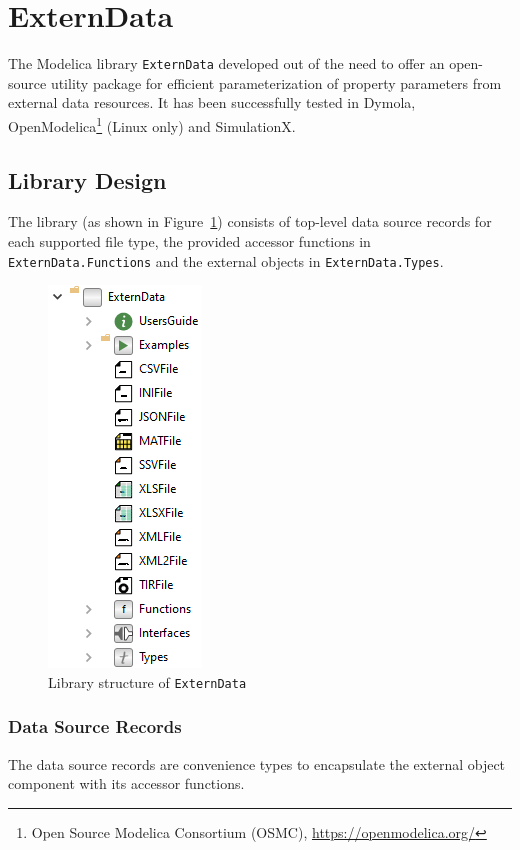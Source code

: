 \documentclass{modelica}
\newcommand{\modelica}[1]{\lstinline[language=modelica]|#1|}
\begin{document}
\section{ExternData}

The Modelica library \modelica{ExternData} developed out of the need to offer an open-source utility package for efficient parameterization of property parameters from external data resources.
It has been successfully tested in Dymola, OpenModelica\footnote{Open Source Modelica Consortium (OSMC),
\url{https://openmodelica.org/}} (Linux only) and SimulationX.

\subsection{Library Design}

The library (as shown in Figure~\ref{fig:ExternData}) consists of top-level data source records for each supported file type, the provided accessor functions in \modelica{ExternData.Functions} and the external objects in \modelica{ExternData.Types}.
\begin{figure}[!hb]
\centering
\includegraphics[scale=0.8]{resources/ExternData.png}
\caption{Library structure of \modelica{ExternData}}
\label{fig:ExternData}
\end{figure}

\subsubsection{Data Source Records}

The data source records are convenience types to encapsulate the external object component with its accessor functions.
\end{document}
